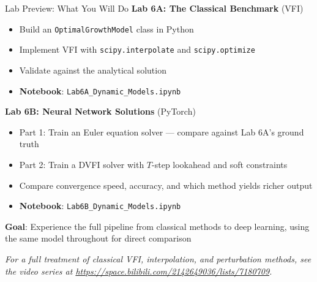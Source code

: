 \documentclass[10pt,english,aspectratio=169]{beamer}
\begin{document}
\begin{frame}{Lab Preview: What You Will Do}
\textbf{Lab 6A: The Classical Benchmark} (VFI)
\begin{itemize}
  \item Build an \texttt{OptimalGrowthModel} class in Python
  \item Implement VFI with \texttt{scipy.interpolate} and \texttt{scipy.optimize}
  \item Validate against the analytical solution
  \item \textbf{Notebook}: \texttt{Lab6A\_Dynamic\_Models.ipynb}
\end{itemize}

\vspace{0.3cm}
\textbf{Lab 6B: Neural Network Solutions} (PyTorch)
\begin{itemize}
  \item Part 1: Train an Euler equation solver --- compare against Lab 6A's ground truth
  \item Part 2: Train a DVFI solver with $T$-step lookahead and soft constraints
  \item Compare convergence speed, accuracy, and which method yields richer output
  \item \textbf{Notebook}: \texttt{Lab6B\_Dynamic\_Models.ipynb}
\end{itemize}

\vspace{0.3cm}
\textbf{Goal}: Experience the full pipeline from classical methods to deep learning, using the same model throughout for direct comparison

\vspace{0.2cm}
{\footnotesize \emph{For a full treatment of classical VFI, interpolation, and perturbation methods, see the video series at \url{https://space.bilibili.com/2142649036/lists/7180709}.}}
\end{frame}


\end{document}
